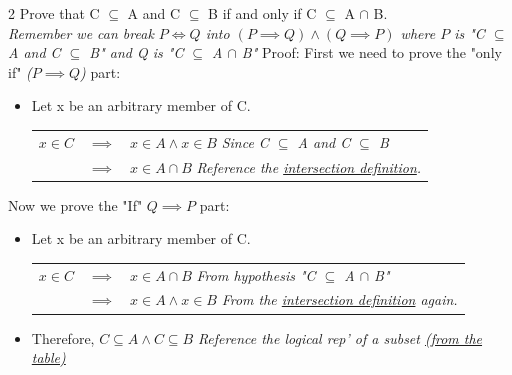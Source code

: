 \documentclass[12pt, letterpaper]{article}
\newcommand{\exheader}[1][ex]{{\tiny{#1}\normalsize}}
\begin{document}
\exheader[2] Prove that C $\subseteq$ A and C $\subseteq$ B if and only if C $\subseteq$ A $\cap$ B. \vspace*{-0.2cm}
\\ {\tiny \emph{Remember we can break $P \iff Q$ into $(P \implies Q) \land (Q \implies P)$ where $P$ is "C $\subseteq$ A and C $\subseteq$ B" and Q is "C $\subseteq$ A $\cap$ B"}} 
\smallbreak Proof:
\smallbreak First we need to prove the "only if" {\tiny \emph{($P \implies Q$)}} part:
\begin{itemize}[leftmargin=*, label={}]
	\item Let x be an arbitrary member of C. \\
	\begin{tabular}{l l l}
		$ x \in C $ & $\implies$ & $x \in A \land x \in B$ {\tiny \emph{Since C $\subseteq$ A and C $\subseteq$ B}} \\
		& $\implies$ & $x \in A \cap B$ {\tiny \emph{Reference the \hyperref[sec:intersectiondef]{intersection definition}.}}
	\end{tabular}
\end{itemize} \smallbreak
Now we prove the "If" {\tiny \emph{$Q \implies P$}} part:
\begin{itemize}[leftmargin=*, label={}]
	\item Let x be an arbitrary member of C. \\
	\begin{tabular}{l l l}
		$ x \in C$ & $\implies$ & $x \in A \cap B$ {\tiny \emph{From hypothesis "C $\subseteq$ A $\cap$ B"}} \\
		& $\implies$ & $x \in A \land x \in B$ {\tiny \emph{From the \hyperref[sec:intersectiondef]{intersection definition} again.}}
	\end{tabular}
	\item Therefore, $C \subseteq A \land C \subseteq B$ {\tiny \emph{Reference the logical rep' of a subset \hyperref[sec:setrelations]{(from the table)}}}
\end{itemize}

\pagebreak
\end{document}
